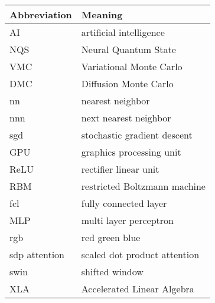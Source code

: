 \noindent\\\\

\begin{tabular}[h]{p{3cm}|l}
	Abbreviation & Meaning\\
	\hline
	AI & artificial intelligence\\ 
	NQS & Neural Quantum State\\
	VMC & Variational Monte Carlo\\
	DMC & Diffusion Monte Carlo\\
	nn & nearest neighbor\\
	nnn & next nearest neighbor\\
	sgd & stochastic gradient descent\\
	GPU & graphics processing unit\\
	ReLU & rectifier linear unit\\
	RBM & restricted Boltzmann machine\\
	fcl & fully connected layer\\
	MLP & multi layer perceptron\\
	rgb & red green blue\\
	sdp attention & scaled dot product attention\\
	swin & shifted window\\
	XLA & Accelerated Linear Algebra\\
\end{tabular}
\newpage